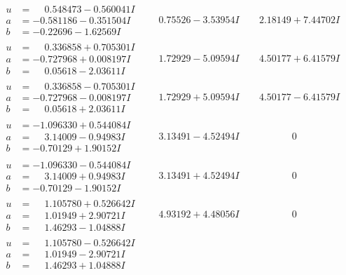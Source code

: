 \documentclass[1p]{elsarticle_modified}
\theoremstyle{definition}
\begin{document}
$$\begin{array}{c|c|c}
\begin{aligned}
u &= \phantom{-}0.548473 - 0.560041 I \\
a &= -0.581186 - 0.351504 I \\
b &= -0.22696 - 1.62569 I\end{aligned}
 & \phantom{-}0.75526 - 3.53954 I & \phantom{-}2.18149 + 7.44702 I \\ \hline\begin{aligned}
u &= \phantom{-}0.336858 + 0.705301 I \\
a &= -0.727968 + 0.008197 I \\
b &= \phantom{-}0.05618 - 2.03611 I\end{aligned}
 & \phantom{-}1.72929 - 5.09594 I & \phantom{-}4.50177 + 6.41579 I \\ \hline\begin{aligned}
u &= \phantom{-}0.336858 - 0.705301 I \\
a &= -0.727968 - 0.008197 I \\
b &= \phantom{-}0.05618 + 2.03611 I\end{aligned}
 & \phantom{-}1.72929 + 5.09594 I & \phantom{-}4.50177 - 6.41579 I \\ \hline\begin{aligned}
u &= -1.096330 + 0.544084 I \\
a &= \phantom{-}3.14009 - 0.94983 I \\
b &= -0.70129 + 1.90152 I\end{aligned}
 & \phantom{-}3.13491 - 4.52494 I & \phantom{-0.000000 } 0 \\ \hline\begin{aligned}
u &= -1.096330 - 0.544084 I \\
a &= \phantom{-}3.14009 + 0.94983 I \\
b &= -0.70129 - 1.90152 I\end{aligned}
 & \phantom{-}3.13491 + 4.52494 I & \phantom{-0.000000 } 0 \\ \hline\begin{aligned}
u &= \phantom{-}1.105780 + 0.526642 I \\
a &= \phantom{-}1.01949 + 2.90721 I \\
b &= \phantom{-}1.46293 - 1.04888 I\end{aligned}
 & \phantom{-}4.93192 + 4.48056 I & \phantom{-0.000000 } 0 \\ \hline\begin{aligned}
u &= \phantom{-}1.105780 - 0.526642 I \\
a &= \phantom{-}1.01949 - 2.90721 I \\
b &= \phantom{-}1.46293 + 1.04888 I\end{aligned}

\end{array}$$
\end{document}
